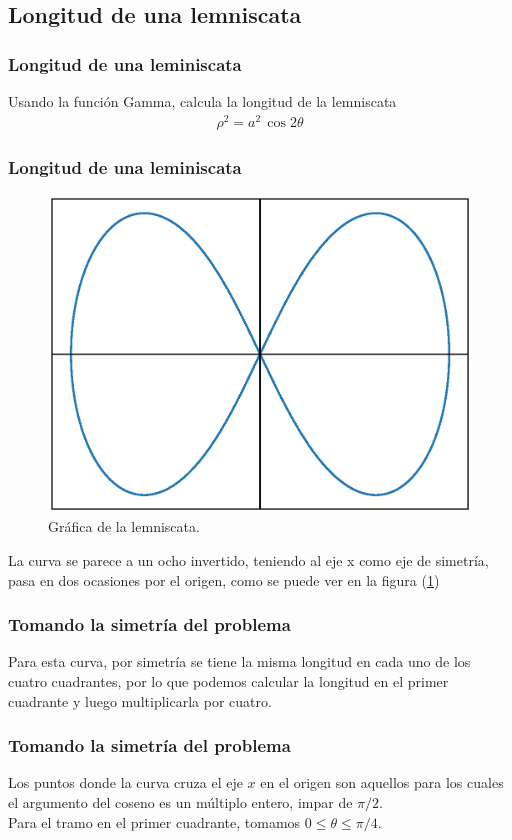 \subsection{Longitud de una lemniscata}
\begin{frame}
\frametitle{Longitud de una leminiscata}
Usando la función Gamma, calcula la longitud de la lemniscata
\begin{align*}
\rho^{2} = a^{2} \, \cos 2 \theta
\end{align*}
\end{frame}
\begin{frame}
\frametitle{Longitud de una leminiscata}
\begin{figure}
    \centering
    \includegraphics[scale=0.35]{Imagenes/plot_leminscata_01.eps}
    \caption{Gráfica de la lemniscata.}
    \label{fig:figura_lemniscata}
\end{figure}
La curva se parece a un ocho invertido, teniendo al eje x como eje de simetría, pasa en dos ocasiones por el origen, como se puede ver en la figura (\ref{fig:figura_lemniscata})
\end{frame}
\begin{frame}
\frametitle{Tomando la simetría del problema}
Para esta curva, por simetría se tiene la misma longitud en cada uno de los cuatro cuadrantes, por lo que podemos calcular la longitud en el primer cuadrante y luego multiplicarla por cuatro.
\end{frame}
\begin{frame}
\frametitle{Tomando la simetría del problema}
Los puntos donde la curva cruza el eje $x$ en el origen son aquellos para los cuales el argumento del coseno es un múltiplo entero, impar de $\pi / 2$. 
\\
\bigskip
Para el tramo en el primer cuadrante, tomamos $0 \leq \theta \leq \pi/4$.
\end{frame}
